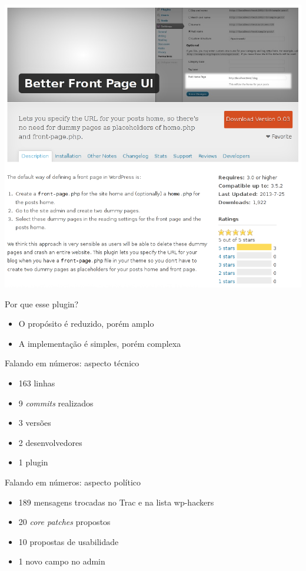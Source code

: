 \documentclass{beamer}
\begin{document}
\begin{frame}
\begin{center}
  \includegraphics[width=\textwidth]{./img/plugin-screenshot.png}
\end{center}
\end{frame}

\begin{frame}{Por que esse plugin?}
\begin{itemize}
  \pause \item O propósito é reduzido, porém amplo
  \pause \item A implementação é simples, porém complexa
\end{itemize}
\end{frame}

\begin{frame}{Falando em números: aspecto técnico}
\begin{itemize}
  \pause \item 163 linhas
  \pause \item 9 \emph{commits} realizados
  \pause \item 3 versões
  \pause \item 2 desenvolvedores
  \pause \item 1 plugin
\end{itemize}
\end{frame}

\begin{frame}{Falando em números: aspecto político}
\begin{itemize}
  \pause \item 189 mensagens trocadas no Trac e na lista wp-hackers
  \pause \item 20 \emph{core patches} propostos
  \pause \item 10 propostas de usabilidade
  \pause \item 1 novo campo no admin
\end{itemize}
\end{frame}
\end{document}
